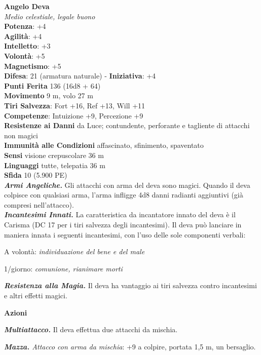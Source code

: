 \begin{multicols}{2}
\medskip\textbf{Angelo Deva}\\
\emph{Medio celestiale, legale buono}\\
\textbf{Potenza}: +4\\
\textbf{Agilità}: +4\\
\textbf{Intelletto}: +3\\
\textbf{Volontà}: +5\\
\textbf{Magnetismo}: +5\\
\textbf{Difesa}: 21 (armatura naturale) - \textbf{Iniziativa}: +4\\
\textbf{Punti Ferita} 136 (16d8 + 64)\\
\textbf{Movimento} 9 m, volo 27 m\\
\textbf{Tiri Salvezza}: Fort +16, Ref +13, Will +11\\
\textbf{Competenze}: Intuizione +9, Percezione +9\\
\textbf{Resistenze ai Danni} da Luce; contundente, perforante e tagliente di attacchi non magici\\
\textbf{Immunità alle Condizioni} affascinato, sfinimento, spaventato\\
\textbf{Sensi} visione crepuscolare 36 m\\
\textbf{Linguaggi} tutte, telepatia 36 m\\
\textbf{Sfida} 10 (5.900 PE)\\


\emph{\textbf{Armi Angeliche.}} Gli attacchi con arma del deva sono magici. Quando il deva colpisce con qualsiasi arma, l'arma infligge 4d8 danni radianti aggiuntivi (già compresi nell'attacco).\\
\emph{\textbf{Incantesimi Innati.}} La caratteristica da incantatore innato del deva è il Carisma (DC 17 per i tiri salvezza degli incantesimi). Il deva può lanciare in maniera innata i seguenti incantesimi, con l'uso delle sole componenti verbali: 
\item
A volontà: \emph{individuazione del bene e del male}
\item
1/giorno: \emph{comunione, rianimare morti}

\emph{\textbf{Resistenza alla Magia.}} Il deva ha vantaggio ai tiri
salvezza contro incantesimi e altri effetti magici.

\textbf{Azioni}

\emph{\textbf{Multiattacco.}} Il deva effettua due attacchi da mischia.

\emph{\textbf{Mazza.} Attacco con arma da mischia}: +9 a colpire,
portata 1,5 m, un bersaglio.


\end{multicols}
